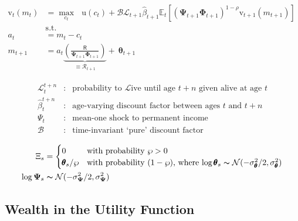 \documentclass{article}
\newcommand{\CRRA}{\rho}
\newcommand{\DiscFac}{\beta}
\newcommand{\PermGroFac}{\pmb{\Phi}}
\newcommand{\uFunc}{\mathrm{u}}
\newcommand{\vFunc}{\mathrm{v}}
\newcommand{\Rfree}{\mathsf{R}}
\newcommand{\Alive}{\mathcal{L}}
\newcommand{\PermShk}{\mathbf{\Psi}}
\newcommand{\RNrm}{\mathcal{R}}
\newcommand{\TranShkEmp}{\pmb{\theta}}
\newcommand{\Ex}{\mathbb{E}}
\newcommand{\beth}{\mathcal{B}}
\newcommand{\pZero}{\wp}
\begin{document}
\begin{equation}
\begin{align}
  {\vFunc}_{t}({m}_{t}) & = \max_{{c}_{t}}~~~ \uFunc({c}_{t})+\beth\Alive_{t+1}\hat{\DiscFac}_{t+1}
  \Ex_{t}[(\PermShk_{t+1}\PermGroFac_{t+1})^{1-\CRRA}{\vFunc}_{t+1}({m}_{t+1})]                                 \\
                        & \text{s.t.}                                                               & \nonumber \\
  {a}_{t}               & = {m}_{t}-{c}_{t} \nonumber
  \\  {m}_{t+1}  & = {a}_{t}\underbrace{\left(\frac{\Rfree}{\PermShk_{t+1}\PermGroFac_{t+1}}\right)}_{\equiv \RNrm_{t+1}}+ ~\TranShkEmp_{t+1}
\end{align}
\end{equation}

\begin{equation}
\begin{align}
  \Alive _{t}^{t+n} & : & \text{probability to }\Alive\text{ive until age $t+n$ given alive at age $t$}
  \\  \hat{\DiscFac}_{t}^{t+n} &:&\text{age-varying discount factor between ages $t$ and $t+n$}
  \\     \Psi_{t} &:&\text{mean-one shock to permanent income}
  \\     \beth &:&\text{time-invariant `pure' discount factor}
\end{align}
\end{equation}

\begin{equation}
\begin{align}
  \Xi_{s}           & =
  \begin{cases}
      0\phantom{/\pZero}     & \text{with probability $\pZero>0$}                                                                                                            \\
      \TranShkEmp_{s}/\pZero & \text{with probability $(1-\pZero)$, where $\log \TranShkEmp_{s}\thicksim \mathcal{N}(-\sigma_{\TranShkEmp}^{2}/2,\sigma_{\TranShkEmp}^{2})$} \\
  \end{cases} \\
  \log \PermShk_{s} & \thicksim \mathcal{N}(-\sigma_{\PermShk}^{2}/2,\sigma_{\PermShk}^{2})
\end{align}
\end{equation}

\subsection{Wealth in the Utility Function}\label{Wealth in the Utility Function}
\end{document}
